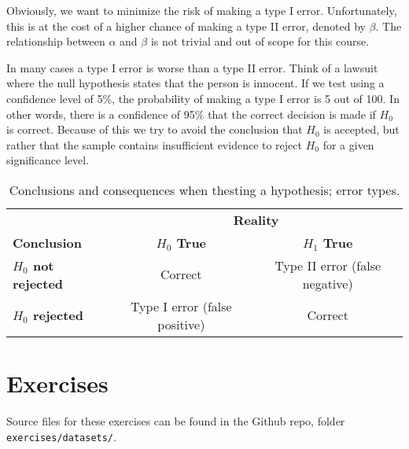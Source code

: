 Obviously, we want to minimize the risk of making a type I error.
Unfortunately, this is at the cost of a higher chance of making a type II error, denoted by $\beta$.
The relationship between $\alpha$ and $\beta$ is not trivial and out of scope for this course.

In many cases a type I error is worse than a type II error.
Think of a lawsuit where the null hypothesis states that the person is innocent.
If we test using a confidence level of 5\%, the probability of making a type I error is 5 out of 100.
In other words, there is a confidence of 95\% that the correct decision is made if $H_{0}$ is correct.
Because of this we try to avoid the conclusion that $H_{0}$ is accepted, 
but rather that the sample contains insufficient evidence to reject $H_{0}$ for a given significance level.

\begin{table}
  \centering
  \begin{tabular}{@{}l|cc@{}}
    \toprule
    & \multicolumn{2}{c}{\textbf{Reality}} \\
    \textbf{Conclusion}             & \textbf{$H_{0}$ True} & \textbf{$H_{1}$ True}     \\
    \midrule
    \textbf{$H_{0}$ not rejected} & Correct                       & Type II error (false negative) \\
    \textbf{$H_{0}$ rejected}     & Type I error (false positive) & Correct            \\
    \bottomrule
  \end{tabular}
  \caption{Conclusions and consequences when thesting a hypothesis; error types.}
  \label{tab:hypfouten}
\end{table}

\section{Exercises}
\label{sec:testing-procedures-exercises}

Source files for these exercises can be found in the Github repo, folder \texttt{exercises/datasets/}.



